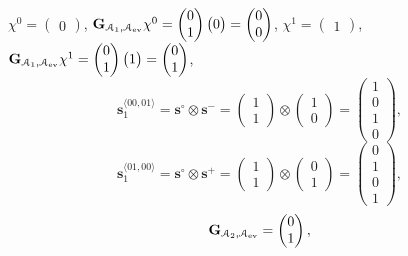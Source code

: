 $\chi^0 = \begin{pmatrix} 0 \end{pmatrix} $, 
$ \mathbf{G}_{\mathcal{A}_1, \mathcal{A}_{\mathrm{ev}}} \chi^0 =\begin{pmatrix} 0 \\ 1 \end{pmatrix}  \begin{pmatrix} 0 \end{pmatrix} = \begin{pmatrix}  0 \\ 0 \end{pmatrix}$,
$\chi^1 = \begin{pmatrix} 1 \end{pmatrix} $, 
$ \mathbf{G}_{\mathcal{A}_1, \mathcal{A}_{\mathrm{ev}}} \chi^1 = \begin{pmatrix} 0 \\ 1 \end{pmatrix} \begin{pmatrix} 1 \end{pmatrix}  = \begin{pmatrix}  0 \\ 1 \end{pmatrix}$,
\begin{equation*}
\mathbf{s}_1^{\langle 00, 01 \rangle} = \mathbf{s}^\circ \otimes \mathbf{s}^- = \begin{pmatrix} 1 \\ 1 \end{pmatrix} \otimes \begin{pmatrix}  1 \\ 0 \end{pmatrix} = \begin{pmatrix}  1 \\ 0 \\ 1 \\ 0 \end{pmatrix},
\end{equation*}
\begin{equation*}
\mathbf{s}_1^{\langle 01, 00 \rangle} = \mathbf{s}^\circ \otimes \mathbf{s}^+ =
\begin{pmatrix} 1 \\ 1 \end{pmatrix} \otimes \begin{pmatrix}  0 \\ 1 \end{pmatrix} = \begin{pmatrix}  0 \\ 1 \\ 0 \\ 1 \end{pmatrix},
\end{equation*}
\begin{equation*}
\mathbf{G}_{\mathcal{A}_2, \mathcal{A}_{\mathrm{ev}}} = \begin{pmatrix} 0 \\ 1\end{pmatrix},
\end{equation*}

